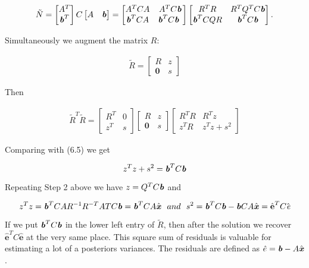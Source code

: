 \begin{align}
\tilde{N}=
\begin{bmatrix}
A^{T} \\	
\textbf{\textit{b}}^{T}
\end{bmatrix}C
\begin{bmatrix}
A &	 \textbf{\textit{b}}
\end{bmatrix}=
\begin{bmatrix}
A^{T}CA&A^{T}C\textbf{\textit{b}} \\	
\textbf{\textit{b}}^{T}CA&\textbf{\textit{b}}^{T}C\textbf{\textit{b	}}
\end{bmatrix}
\begin{bmatrix}
R^{T}R&R^{T}Q^{T}C\textbf{\textit{b}} \\	
\textbf{\textit{b}}^{T}CQR&\textbf{\textit{b}}^{T}C\textbf{\textit{b}}
\end{bmatrix}.
\end{align}
\begin{flushleft}
	Simultaneously we augment the matrix $R$:
\end{flushleft}
\begin{align}
\tilde{R}=
\begin{bmatrix}
R          &  z\\	
\textbf{0} &  s
\end{bmatrix}
\end{align}
\begin{flushleft}
	Then
\end{flushleft}
\begin{align}
\tilde{R}^{T}\tilde{R}=
\begin{bmatrix}
R^{T}      &  0\\	
z^{T}      &  s
\end{bmatrix}
\begin{bmatrix}
R          &  z\\	
\textbf{0} &  s
\end{bmatrix}
\begin{bmatrix}
R^{T}R        & R^{T}z\\	
z^{T}R        &  z^{T}z+s^{2}
\end{bmatrix}
\end{align}
\begin{flushleft}
	Comparing with (6.5) we get
\end{flushleft}
$$ z^{T}z+s^{2}=\textbf{\textit{b}}^{T}C\textbf{\textit{b}} $$
\begin{flushleft}
	Repeating Step 2 above we have $ z=Q^{T}C\textbf{\textit{b}}$ and
\end{flushleft}
$$ z^{T}z= \textbf{\textit{b}}^{T}CAR^{-1}R^{-T}ATC\textbf{\textit{b}}=\textbf{\textit{b}}^{T}CA\hat{\textbf{\textit{x}}} \ \ and \ \ s^{2}=\textbf{\textit{b}}^{T}C\textbf{\textit{b}}-\textbf{\textit{b}}CA\hat{\textbf{\textit{x}}}=\hat{\textbf{e}}^{T}C\hat{\textit{e}}$$
\begin{flushleft}
	If we put $\textbf{\textit{b}}^{T}C\textbf{\textit{b}}$ in the lower left entry of $\tilde{R}$, then after the solution we recover $\hat{\textbf{e}}^{T}C\hat{\textbf{e}}$ at the very same place. This square sum of residuals is valuable for estimating a lot of a posteriors variances. The residuals are defined as $ \hat{e}=\textbf{\textit{b}}-A\hat{\textbf{\textit{x}}}$.
\end{flushleft}
